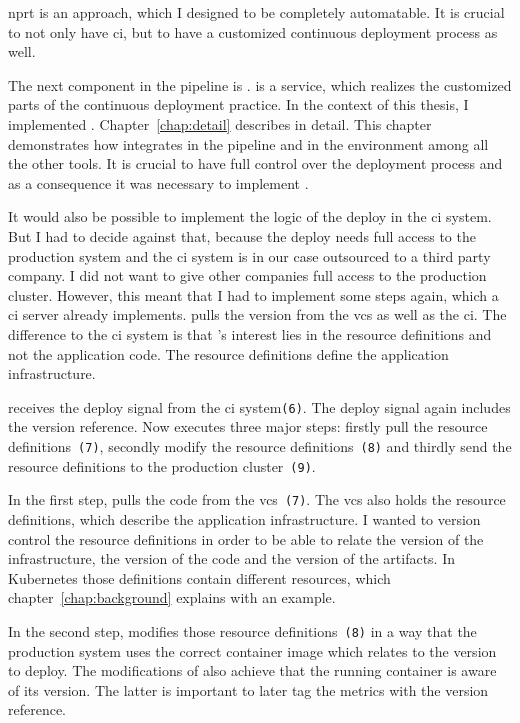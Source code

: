 \gls{nprt} is an approach, which I designed to be completely automatable. It is crucial to
not only have \gls{ci}, but to have a customized continuous deployment process as well.

The next component in the pipeline is \deployer. \deployer is a service, which realizes the
customized parts of the continuous deployment practice. In the context of this thesis, I
implemented \deployer. Chapter~\ref{chap:detail} describes \deployer in detail. This chapter
demonstrates how \deployer integrates in the pipeline and in the environment among all the
other tools. It is crucial to have full control over the deployment process and as a
consequence it was necessary to implement \deployer.

It would also be possible to implement the logic of the deploy in the \gls{ci} system. But
I had to decide against that, because the deploy needs full access to the production
system and the \gls{ci} system is in our case outsourced to a third party company. I did
not want to give other companies full access to the production cluster. However, this
meant that I had to implement some steps again, which a \gls{ci} server already
implements. \deployer pulls the version from the \gls{vcs} as well as the \gls{ci}. The
difference to the \gls{ci} system is that \deployer's interest lies in the resource
definitions and not the application code. The resource definitions define the application
infrastructure.

\deployer receives the deploy signal from the \gls{ci} system\texttt{(6)}. The deploy
signal again includes the version reference. Now \deployer executes three major steps:
firstly pull the resource definitions~\texttt{(7)}, secondly modify the resource
definitions~\texttt{(8)} and thirdly send the resource definitions to the production
cluster~\texttt{(9)}.

In the first step, \deployer pulls the code from the \gls{vcs}~\texttt{(7)}. The \gls{vcs}
also holds the resource definitions, which describe the application infrastructure. I
wanted to version control the resource definitions in order to be able to relate the
version of the infrastructure, the version of the code and the version of the
artifacts. In Kubernetes those definitions contain different resources, which
chapter~\ref{chap:background} explains with an example.

In the second step, \deployer modifies those resource definitions~\texttt{(8)} in a way
that the production system uses the correct container image which relates to the version
to deploy. The modifications of \deployer also achieve that the running container is aware
of its version. The latter is important to later tag the metrics with the version
reference.

